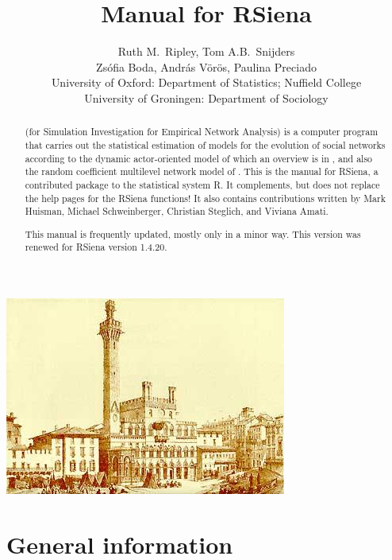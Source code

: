 \documentclass[a4paper,fleqn,11pt]{article}
\title{{\Huge Manual for \textsf{RSiena} } }
\author{\Large Ruth M.\ Ripley, Tom A.B.\ Snijders\\[1ex]
        \Large Zs\'{o}fia Boda, Andr\'{a}s V\"{o}r\"{o}s, Paulina Preciado  \\[4ex]
       {\large University of Oxford: Department of Statistics; Nuffield College}\\[1ex]
       {\large University of Groningen: Department of Sociology}\\[1ex]
    }
\newcommand{\+}{\, + \,}
\newcommand{\Rn}{{\sf R}}
\newcommand{\rs}{{\sf RSiena}}
\newcommand{\RS}{{\sf \textsf{RSiena} }}
\newcommand{\SI}{{\sf SIENA }}
\begin{document}

\maketitle

\vfill
\begin{center}
\includegraphics*[scale=3]{ilcampo.jpg}
\end{center}
\vfill

\begin{abstract}
\noindent \SI (for {\sf Simulation Investigation for Empirical
Network Analysis}) is a computer program that carries out the
statistical estimation of models for the evolution of social
networks according to the dynamic actor-oriented model of
which an overview is in \citet{Snijders2017},
and also the random coefficient multilevel network model of
\citet{KoskinenSnijders2023}.
This is the manual for \rs,
a contributed package to the statistical system \Rn.
It complements, but does not replace the help pages
for the \RS functions!
It also contains contributions written
by Mark Huisman, Michael Schweinberger, Christian Steglich,
and Viviana Amati.

This manual is frequently updated, mostly only in a minor way.
This version was renewed for \RS version 1.4.20.
\end{abstract}




\vfill
\newpage
\tableofcontents
\newpage

\makeatletter
\def\@linkcolor{lc}
\makeatother


\section{General information}
\end{document}
